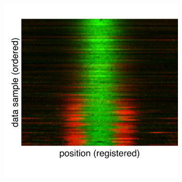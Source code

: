 \documentclass{pnastwo}
\begin{document}
\begin{figure}
\begin{minipage}{0.3\textwidth}
\begin{subfigure}{\textwidth}
\caption{}
\label{subfig:rank_corr}
\end{subfigure}
\begin{subfigure}{\textwidth}
\includegraphics[width=\textwidth]{registered_ordered_hand}
\caption{}
\end{subfigure}
\end{minipage}
\end{figure}
\end{document}
